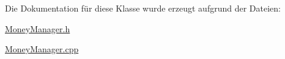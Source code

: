 Die Dokumentation für diese Klasse wurde erzeugt aufgrund der Dateien\-:\begin{DoxyCompactItemize}
\item 
\hyperlink{_money_manager_8h}{Money\-Manager.\-h}\item 
\hyperlink{_money_manager_8cpp}{Money\-Manager.\-cpp}\end{DoxyCompactItemize}
